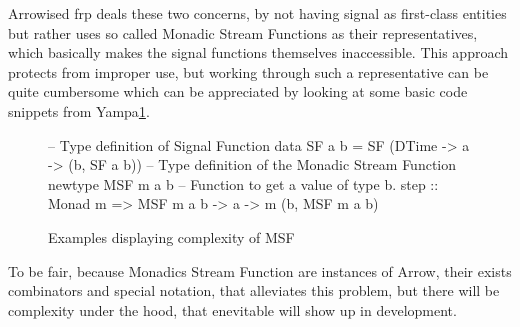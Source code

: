 \par Arrowised \acrshort{frp} deals these two concerns, by not having signal as first-class entities but rather uses so called Monadic Stream Functions as their representatives, which basically makes the signal functions themselves inaccessible. This approach protects from improper use, but working through such a representative can be quite cumbersome which can be appreciated by looking at some basic code snippets from Yampa\parencite{runtimeVerification}\ref{lst:yampaSnipppets}.
\begin{figure}
    \centering
    \begin{hscode}
        -- Type definition of Signal Function
        data SF a b = SF (DTime -> a -> (b, SF a b)) 
        -- Type definition of the Monadic Stream Function
        newtype MSF m a b
        -- Function to get a value of type b. 
        step :: Monad m => MSF m a b -> a -> m (b, MSF m a b)
    \end{hscode}
    \caption{Examples displaying complexity of MSF \parencite{runtimeVerification}}
    \label{lst:yampaSnipppets}
\end{figure}
To be fair, because Monadics Stream Function are instances of Arrow, their exists combinators and special notation\parencite{paterson}, that alleviates this problem, but there will be complexity under the hood, that enevitable will show up in development. 

